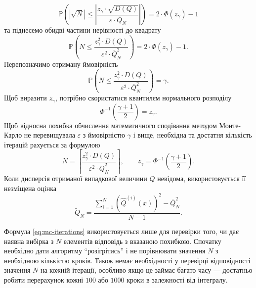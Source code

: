 \begin{equation*}
  \mathbb{P}\left(
    \left|
      \sqrt{N}
    \right|
    \le \left|
      \frac{z_{\gamma} \cdot \sqrt{D\left( Q \right)}}
      {\varepsilon \cdot \overline{Q}_N} \right|
  \right)
  = 2 \cdot \Phi\left( z_{\gamma} \right) - 1
\end{equation*}
та піднесемо обидві частини нерівності до квадрату
\begin{equation*}
  \mathbb{P}\left(
    N
    \le \frac{z^2_{\gamma} \cdot D\left( Q \right)}
      {\varepsilon^2 \cdot \overline{Q}_N^2}
  \right)
  = 2 \cdot \Phi\left( z_{\gamma} \right) - 1.
\end{equation*}
Перепозначимо отриману ймовірність
\begin{equation*}
  \mathbb{P}\left(
    N
    \le \frac{z^2_{\gamma} \cdot D\left( Q \right)}
      {\varepsilon^2 \cdot \overline{Q}_N^2}
  \right)
  = \gamma.
\end{equation*}
Щоб виразити $z_{\gamma}$,
потрібно скористатися квантилєм нормального розподілу
\begin{equation*}
  \Phi^{-1}\left( \frac{\gamma + 1}{2} \right) = z_{\gamma}.
\end{equation*}
Щоб відносна похибка обчислення математичного сподівання методом Монте-Карло
не перевищувала $\varepsilon$ з ймовірністю $\gamma$ і вище,
необхідна та достатня кількість ітерацій рахується за формулою
\begin{equation}\label{eq:mc-iterations}
    N
    = \left\lceil \frac{z^2_{\gamma} \cdot D\left( Q \right)}
      {\varepsilon^2 \cdot \overline{Q}_N^2} \right\rceil, \qquad
    z_{\gamma} = \Phi^{-1}\left( \frac{\gamma + 1}{2} \right).
\end{equation}
Коли дисперсія отриманої випадкової величини $Q$ невідома,
використовується її незміщена оцінка
\begin{equation*}
  \widetilde{Q}_N
  = \frac{
    \sum\limits_{i=1}^{N}
      \left( \hat{Q}^{\left( i \right)}\left( x \right) \right)^2
    - \overline{Q}_N^2}{N - 1}.
\end{equation*}

Формула \eqref{eq:mc-iterations} використовується лише для перевірки того,
чи дає наявна вибірка з $N$ елементів відповідь з вказаною похибкою.
Спочатку необхідно дати алгоритму ``розігрітись'' і не порівнювати значення $N$
з необхідною кількістю кроків.
Також немає необхідності у перевірці відповідності значення $N$
на кожній ітерації,
особливо якщо це займає багато часу ---
достатньо робити перерахунок кожні $100$ або $1000$ кроки в залежності від
інтегралу.

